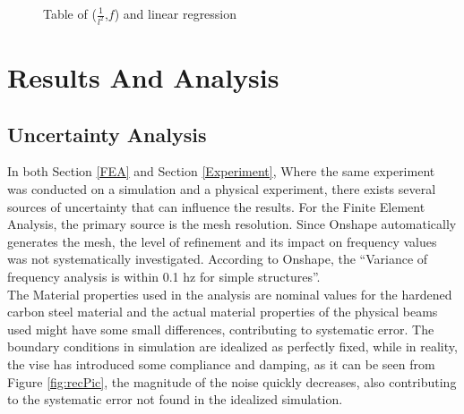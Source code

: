 \documentclass[a4paper,12pt]{article}
\begin{document}
    \begin{figure}[H]%
    \begin{center}

    \caption{Table of ($\frac{1}{l^{2}}$,$f$) and linear regression}\label{fig:EXPregression}
    \end{center}
    \end{figure}

\section{Results And Analysis}\label{ResultsAnalysis}%
    \subsection{Uncertainty Analysis}%
    In both Section \ref{FEA} and Section \ref{Experiment}, Where the same experiment was conducted on a simulation and a physical experiment, there exists several sources of uncertainty that can influence the results.  For the Finite Element Analysis, the primary source is the mesh resolution. Since Onshape automatically generates the mesh, the level of refinement and its impact on frequency values was not systematically investigated. According to Onshape, the ``Variance of frequency analysis is within 0.1 hz for simple structures''.\\
    The  Material properties used in the analysis are nominal values for the hardened carbon steel material and the actual material properties of the physical beams used might have some small differences, contributing to systematic error. The boundary conditions in simulation are idealized as perfectly fixed, while in reality, the vise has introduced some compliance and damping, as it can be seen from Figure \ref{fig:recPic}, the magnitude of the noise quickly decreases, also contributing to the systematic error not found in the idealized simulation.
\end{document}
